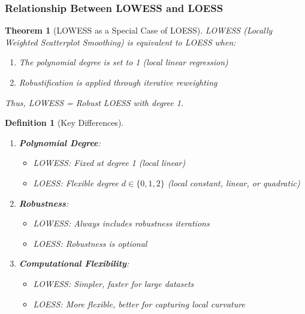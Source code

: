 \documentclass{article}
\newtheorem{definition}{Definition}
\newtheorem{theorem}{Theorem}
\begin{document}
\subsubsection{Relationship Between LOWESS and LOESS}

\begin{theorem}[LOWESS as a Special Case of LOESS]
LOWESS (Locally Weighted Scatterplot Smoothing) is equivalent to LOESS when:
\begin{enumerate}
    \item The polynomial degree is set to 1 (local linear regression)
    \item Robustification is applied through iterative reweighting
\end{enumerate}
Thus, LOWESS = Robust LOESS with degree 1.
\end{theorem}

\begin{definition}[Key Differences]
\begin{enumerate}
    \item \textbf{Polynomial Degree}: 
        \begin{itemize}
            \item LOWESS: Fixed at degree 1 (local linear)
            \item LOESS: Flexible degree $d \in \{0, 1, 2\}$ (local constant, linear, or quadratic)
        \end{itemize}
    \item \textbf{Robustness}:
        \begin{itemize}
            \item LOWESS: Always includes robustness iterations
            \item LOESS: Robustness is optional
        \end{itemize}
    \item \textbf{Computational Flexibility}:
        \begin{itemize}
            \item LOWESS: Simpler, faster for large datasets
            \item LOESS: More flexible, better for capturing local curvature
        \end{itemize}
\end{enumerate}
\end{definition}
\end{document}
